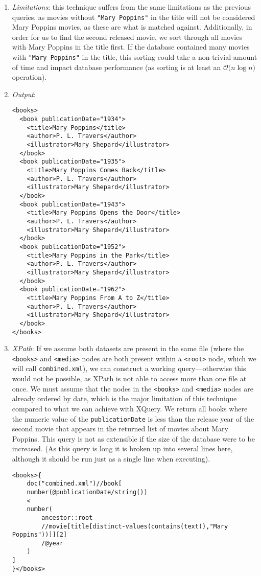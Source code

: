 \documentclass[11pt]{article}
\begin{document}
\begin{enumerate}
\item \textit{Limitations}: this technique suffers from the same limitations as the previous queries, as movies without \texttt{"Mary Poppins"} in the title will not be considered Mary Poppins movies, as these are what is matched against. Additionally, in order for us to find the second released movie, we sort through all movies with Mary Poppins in the title first. If the database contained many movies with \texttt{"Mary Poppins"} in the title, this sorting could take a non-trivial amount of time and impact database performance (as sorting is at least an $\mathcal{O}({n\log{n})}$ operation).
\item \textit{Output}:
\begin{verbatim} 
<books>
  <book publicationDate="1934">
    <title>Mary Poppins</title>
    <author>P. L. Travers</author>
    <illustrator>Mary Shepard</illustrator>
  </book>
  <book publicationDate="1935">
    <title>Mary Poppins Comes Back</title>
    <author>P. L. Travers</author>
    <illustrator>Mary Shepard</illustrator>
  </book>
  <book publicationDate="1943">
    <title>Mary Poppins Opens the Door</title>
    <author>P. L. Travers</author>
    <illustrator>Mary Shepard</illustrator>
  </book>
  <book publicationDate="1952">
    <title>Mary Poppins in the Park</title>
    <author>P. L. Travers</author>
    <illustrator>Mary Shepard</illustrator>
  </book>
  <book publicationDate="1962">
    <title>Mary Poppins From A to Z</title>
    <author>P. L. Travers</author>
    <illustrator>Mary Shepard</illustrator>
  </book>
</books>
\end{verbatim} 

\item \textit{XPath}: If we assume both datasets are present in the same file (where the \texttt{<books>} and \texttt{<media>} nodes are both present within a \texttt{<root>} node, which we will call \texttt{combined.xml}), we can construct a working query---otherwise this would not be possible, as XPath is not able to access more than one file at once. We must assume that the nodes in the \texttt{<books>} and \texttt{<media>} nodes are already ordered by date, which is the major limitation of this technique compared to what we can achieve with XQuery. We return all books where the numeric value of the \texttt{publicationDate} is less than the release year of the second movie that appears in the returned list of movies about Mary Poppins. This query is not as extensible if the size of the database were to be increased. (As this query is long it is broken up into several lines here, although it should be run just as a single line when executing).

\begin{small}
\begin{verbatim}
<books>{
    doc("combined.xml")//book[
    number(@publicationDate/string())
    <
    number(
        ancestor::root
        //movie[title[distinct-values(contains(text(),"Mary Poppins"))]][2]
        /@year
    )
]
}</books>
\end{verbatim}
\end{small}
\end{enumerate}
\end{document}

